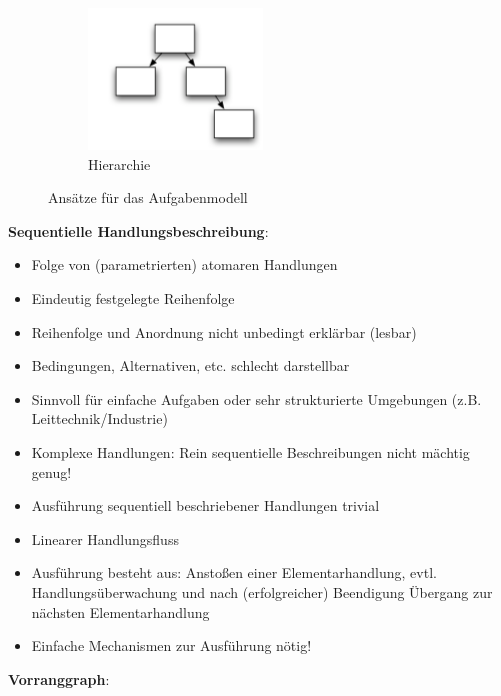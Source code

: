 \begin{figure}[h!]
\begin{subfigure}{.25\textwidth}
		\includegraphics[width=\textwidth]{figures/ch02_ans2.png}
		\caption{Hierarchie}
		\label{hierar}
	\end{subfigure}
	\caption{Ansätze für das Aufgabenmodell}
	\label{ans}
\end{figure}
\newpage
\textbf{Sequentielle Handlungsbeschreibung}:
\begin{itemize}
\item Folge von (parametrierten) atomaren Handlungen
\item Eindeutig festgelegte Reihenfolge
\item Reihenfolge und Anordnung nicht unbedingt erklärbar (lesbar)
\item Bedingungen, Alternativen, etc. schlecht darstellbar
\item Sinnvoll für einfache Aufgaben oder sehr strukturierte Umgebungen (z.B. Leittechnik/Industrie)
\item Komplexe Handlungen: Rein sequentielle Beschreibungen nicht mächtig genug!
\item Ausführung sequentiell beschriebener Handlungen trivial
\item Linearer Handlungsfluss
\item Ausführung besteht aus: Anstoßen einer Elementarhandlung, evtl. Handlungsüberwachung und nach (erfolgreicher) Beendigung Übergang zur nächsten Elementarhandlung
\item Einfache Mechanismen zur Ausführung nötig!
\end{itemize}
\textbf{Vorranggraph}:
